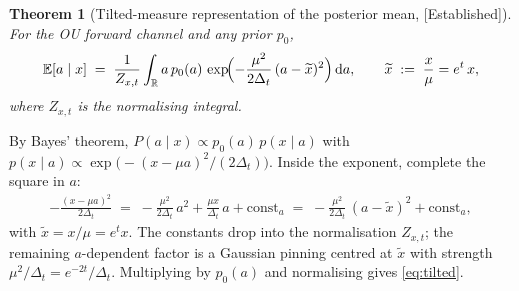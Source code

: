 \documentclass[11pt]{article}
\newtheorem{theorem}[proposition]{Theorem}
\theoremstyle{definition}
\newcommand{\R}{\mathbb{R}}
\newcommand{\E}{\mathbb{E}}
\newcommand{\Detl}{\Delta_t}
\newcommand{\Established}{\textcolor{black!50!green}{\textsf{[Established]}}}
\begin{document}
\begin{theorem}[Tilted-measure representation of the posterior
mean, \Established]\label{thm:tilted}
For the OU forward channel and any prior \(p_0\),
\begin{equation}\label{eq:tilted}
    \E[a \mid x]
    \;=\;
    \frac{1}{Z_{x, t}}
    \int_{\R} a\, p_0(a)\,
        \exp\!\Bigl(-\frac{\mu^2}{2 \Detl}\, (a - \widetilde x)^2\Bigr)\,
        \mathrm d a,
    \qquad
    \widetilde x \;:=\; \frac{x}{\mu} = e^{t}\, x,
\end{equation}
where \(Z_{x, t}\) is the normalising integral.
\end{theorem}

\begin{derivation}
By Bayes' theorem, \(P(a \mid x) \propto p_0(a)\, p(x \mid a)\) with
\(p(x \mid a) \propto \exp\!\bigl(- (x - \mu a)^2 / (2 \Detl)\bigr)\).
Inside the exponent, complete the square in \(a\):
\begin{align}
    -\frac{(x - \mu a)^2}{2 \Detl}
        \;=\; -\frac{\mu^2}{2 \Detl}\, a^2
              + \frac{\mu x}{\Detl}\, a
              + \text{const}_a
        \;=\; -\frac{\mu^2}{2 \Detl}\, (a - \widetilde x)^2
              + \text{const}_a,
\end{align}
with \(\widetilde x = x / \mu = e^t x\). The constants drop into the
normalisation \(Z_{x, t}\); the remaining \(a\)-dependent factor is
a Gaussian pinning centred at \(\widetilde x\) with strength
\(\mu^2 / \Detl = e^{-2 t} / \Detl\). Multiplying by \(p_0(a)\) and
normalising gives \eqref{eq:tilted}.
\end{derivation}
\end{document}
